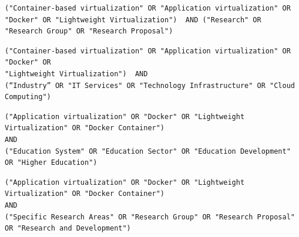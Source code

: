\begin{tcolorbox}[
  colback=gray!5, 
  colframe=black!60, 
  title=Cadena de búsqueda en Science Direct para investigación, 
  fonttitle=\bfseries, 
  sharp corners=south
]
\scriptsize %
\begin{verbatim}
("Container-based virtualization" OR "Application virtualization" OR 
"Docker" OR "Lightweight Virtualization")  AND ("Research" OR 
"Research Group" OR "Research Proposal")
\end{verbatim}
\end{tcolorbox}

\begin{tcolorbox}[
  colback=gray!5, 
  colframe=black!60, 
  title=Cadena de búsqueda en Science Direct para extensión, 
  fonttitle=\bfseries, 
  sharp corners=south
]
\scriptsize %
\begin{verbatim}
("Container-based virtualization" OR "Application virtualization" OR "Docker" OR 
"Lightweight Virtualization")  AND 
(“Industry” OR "IT Services" OR "Technology Infrastructure" OR "Cloud Computing")
\end{verbatim}
\end{tcolorbox}

\begin{tcolorbox}[
  colback=gray!5, 
  colframe=black!60, 
  title=Cadena de búsqueda en Taylor \& Francis para educación, 
  fonttitle=\bfseries, 
  sharp corners=south
]
\scriptsize %
\begin{verbatim}
("Application virtualization" OR "Docker" OR "Lightweight Virtualization" OR "Docker Container")   
AND   
("Education System" OR "Education Sector" OR "Education Development" OR "Higher Education")
\end{verbatim}
\end{tcolorbox}

\begin{tcolorbox}[
  colback=gray!5, 
  colframe=black!60, 
  title=Cadena de búsqueda en Taylor \& Francis para investigación, 
  fonttitle=\bfseries, 
  sharp corners=south
]
\scriptsize %
\begin{verbatim}
("Application virtualization" OR "Docker" OR "Lightweight Virtualization" OR "Docker Container")
AND   
("Specific Research Areas" OR "Research Group" OR "Research Proposal" OR "Research and Development")
\end{verbatim}
\end{tcolorbox}

